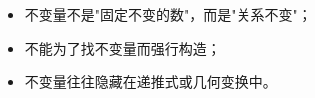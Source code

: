 \begin{ideaBox}
\begin{itemize}
  \item 不变量不是"固定不变的数"，而是"关系不变"；
  \item 不能为了找不变量而强行构造；
  \item 不变量往往隐藏在递推式或几何变换中。
\end{itemize}
\end{ideaBox}
